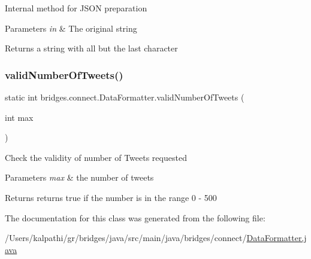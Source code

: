 Internal method for J\+S\+ON preparation 
\begin{DoxyParams}{Parameters}
{\em in} & The original string \\
\hline
\end{DoxyParams}
\begin{DoxyReturn}{Returns}
a string with all but the last character 
\end{DoxyReturn}
\mbox{\label{classbridges_1_1connect_1_1_data_formatter_ad17084ac8b0f28837ebb1d77905cefb8}} 
\subsubsection{\texorpdfstring{validNumberOfTweets()}{validNumberOfTweets()}}
{\footnotesize\ttfamily static int bridges.\+connect.\+Data\+Formatter.\+valid\+Number\+Of\+Tweets (\begin{DoxyParamCaption}\item[{int}]{max }\end{DoxyParamCaption})\hspace{0.3cm}{\ttfamily [static]}}

Check the validity of number of Tweets requested 
\begin{DoxyParams}{Parameters}
{\em max} & the number of tweets \\
\hline
\end{DoxyParams}
\begin{DoxyReturn}{Returns}
returns true if the number is in the range 0 -\/ 500 
\end{DoxyReturn}


The documentation for this class was generated from the following file\+:\begin{DoxyCompactItemize}
\item 
/\+Users/kalpathi/gr/bridges/java/src/main/java/bridges/connect/\mbox{\hyperlink{_data_formatter_8java}{Data\+Formatter.\+java}}\end{DoxyCompactItemize}
